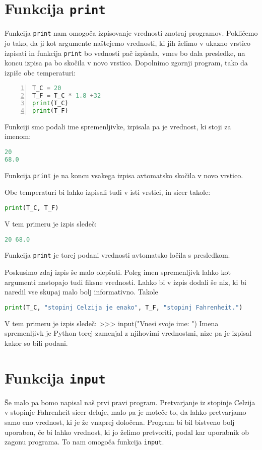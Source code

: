 \section{Funkcija \texttt{print}}
Funkcija \texttt{print} nam omogoča izpisovanje vrednosti znotraj programov. Pokličemo jo tako, da ji kot argumente naštejemo vrednosti, ki jih želimo v ukazno vrstico izpisati in funkcija \texttt{print} bo vednosti pač izpisala, vmes bo dala presledke, na koncu izpisa pa bo skočila v novo vrstico. Dopolnimo zgornji program, tako da izpiše obe temperaturi:
\begin{lstlisting}[language=Python,numbers=left]
T_C = 20
T_F = T_C * 1.8 +32
print(T_C)
print(T_F)
\end{lstlisting}
Funkciji smo podali ime spremenljivke, izpisala pa je vrednost, ki stoji za imenom:
\begin{lstlisting}[language=Python]
20
68.0
\end{lstlisting}
Funkcija \texttt{print} je na koncu vsakega izpisa avtomatsko skočila v novo vrstico.

Obe temperaturi bi lahko izpisali tudi v isti vrstici, in sicer takole:
\begin{lstlisting}[language=Python]
print(T_C, T_F)
\end{lstlisting}
V tem primeru je izpis sledeč:
\begin{lstlisting}[language=Python]
20 68.0
\end{lstlisting}
Funkcija \texttt{print} je torej podani vrednosti avtomatsko ločila s presledkom. 

Poskusimo zdaj izpis še malo olepšati. Poleg imen spremenljivk lahko kot argumenti nastopajo tudi fiksne vrednosti. Lahko bi v izpis dodali še niz, ki bi naredil vse skupaj malo bolj informativno. Takole
\begin{lstlisting}[language=Python]
print(T_C, "stopinj Celzija je enako", T_F, "stopinj Fahrenheit.")
\end{lstlisting}
V tem primeru je izpis sledeč:
>>> input("Vnesi svoje ime: ")
Imena spremenljivk je Python torej zamenjal z njihovimi vrednostmi, nize pa je izpisal kakor so bili podani.

\section{Funkcija \texttt{input}}
Še malo pa bomo napisal naš prvi pravi program. Pretvarjanje iz stopinje Celzija v stopinje Fahrenheit sicer deluje, malo pa je moteče to, da lahko pretvarjamo samo eno vrednost, ki je že vnaprej določena. Program bi bil bistveno bolj uporaben, če bi lahko vrednost, ki jo želimo pretvoriti, podal kar uporabnik ob zagonu programa. To nam omogoča funkcija \texttt{input}.

